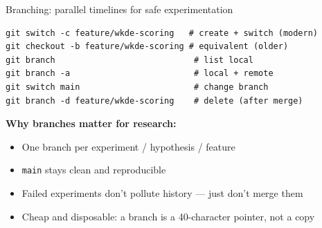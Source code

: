 \documentclass[10pt,aspectratio=169]{beamer}
\begin{document}
\begin{frame}[fragile]{Branching: parallel timelines for safe experimentation}
\begin{lstlisting}
git switch -c feature/wkde-scoring   # create + switch (modern)
git checkout -b feature/wkde-scoring # equivalent (older)
git branch                            # list local
git branch -a                         # local + remote
git switch main                       # change branch
git branch -d feature/wkde-scoring    # delete (after merge)
\end{lstlisting}

  \vspace{0.4em}
  \textbf{Why branches matter for research:}
  \begin{itemize}
    \item One branch per experiment / hypothesis / feature
    \item \texttt{main} stays clean and reproducible
    \item Failed experiments don't pollute history --- just don't merge them
    \item Cheap and disposable: a branch is a 40-character pointer, not a copy
  \end{itemize}
\end{frame}
\end{document}
